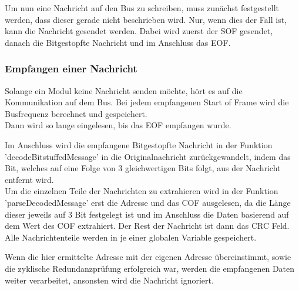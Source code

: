 

Um nun eine Nachricht auf den Bus zu schreiben, muss zunächst festgestellt werden, dass dieser gerade nicht beschrieben wird. Nur, wenn dies der Fall ist, kann die Nachricht gesendet werden. Dabei wird zuerst der SOF gesendet, danach die Bitgestopfte Nachricht und im Anschluss das EOF.


\subsubsection{Empfangen einer Nachricht}
Solange ein Modul keine Nachricht senden möchte, hört es auf die Kommunikation auf dem Bus. Bei jedem empfangenen Start of Frame wird die Busfrequenz berechnet und gespeichert. \\
Dann wird so lange eingelesen, bis das EOF empfangen wurde. 



Im Anschluss wird die empfangene Bitgestopfte Nachricht in der Funktion 'decodeBitstuffedMessage' in die Originalnachricht zurückgewandelt, indem das Bit, welches auf eine Folge von 3 gleichwertigen Bits folgt, aus der Nachricht entfernt wird.\\



Um die einzelnen Teile der Nachrichten zu extrahieren wird in der Funktion 'parseDecodedMessage' erst die Adresse und das COF ausgelesen, da die Länge dieser jeweils auf 3 Bit festgelegt ist und im Anschluss die Daten basierend auf dem Wert des COF extrahiert. Der Rest der Nachricht ist dann das CRC Feld. Alle Nachrichtenteile werden in je einer globalen Variable gespeichert. 



Wenn die hier ermittelte Adresse mit der eigenen Adresse übereinstimmt, sowie die zyklische Redundanzprüfung erfolgreich war, werden die empfangenen Daten weiter verarbeitet, ansonsten wird die Nachricht ignoriert.  

